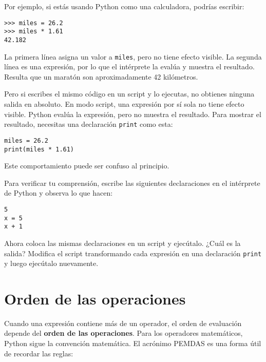 \documentclass[12pt,letterpaper]{book}
\begin{document}
Por ejemplo, si estás usando Python como una calculadora, podrías escribir:

\begin{lstlisting}
>>> miles = 26.2
>>> miles * 1.61
42.182
\end{lstlisting}

La primera línea asigna un valor a \texttt{miles}, pero no tiene efecto visible. La segunda línea es una expresión, por lo que el intérprete la evalúa y muestra el resultado. Resulta que un maratón son aproximadamente 42 kilómetros.

Pero si escribes el mismo código en un script y lo ejecutas, no obtienes ninguna salida en absoluto. En modo script, una expresión por sí sola no tiene efecto visible. Python evalúa la expresión, pero no muestra el resultado. Para mostrar el resultado, necesitas una declaración \texttt{print} como esta:

\begin{lstlisting}
miles = 26.2
print(miles * 1.61)
\end{lstlisting}

Este comportamiento puede ser confuso al principio.

Para verificar tu comprensión, escribe las siguientes declaraciones en el intérprete de Python y observa lo que hacen:

\begin{lstlisting}
5
x = 5
x + 1
\end{lstlisting}

Ahora coloca las mismas declaraciones en un script y ejecútalo. ¿Cuál es la salida? Modifica el script transformando cada expresión en una declaración \texttt{print} y luego ejecútalo nuevamente.

\section{Orden de las operaciones}

Cuando una expresión contiene más de un operador, el orden de evaluación depende del \textbf{orden de las operaciones}. Para los operadores matemáticos, Python sigue la convención matemática. El acrónimo PEMDAS es una forma útil de recordar las reglas:
\end{document}
